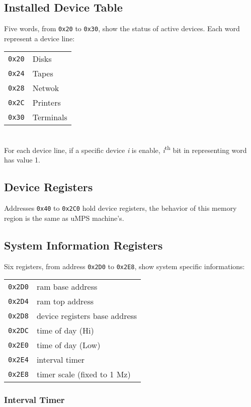 \subsection{Installed Device Table}
Five words, from \texttt{0x20} to \texttt{0x30}, show the status of active devices. Each word represent a device line:
\\

\begin{tabular}{r|l}
\texttt{0x20} & Disks \\
\texttt{0x24} & Tapes \\
\texttt{0x28} & Netwok \\
\texttt{0x2C} & Printers \\
\texttt{0x30} & Terminals \\
\end{tabular}
\\

For each device line, if a specific device \emph{i} is enable, \emph{i}\textsuperscript{th} bit in representing word has value 1.

\subsection{Device Registers}
Addresses \texttt{0x40} to \texttt{0x2C0} hold device registers, the behavior of this memory region is the same as uMPS machine's.

\subsection{System Information Registers}
Six registers, from address \texttt{0x2D0} to \texttt{0x2E8}, show system specific informations:
\\

\begin{tabular}{r|l}
\texttt{0x2D0} & ram base address \\
\texttt{0x2D4} & ram top address \\
\texttt{0x2D8} & device registers base address \\
\texttt{0x2DC} & time of day (Hi) \\
\texttt{0x2E0} & time of day (Low) \\
\texttt{0x2E4} & interval timer \\
\texttt{0x2E8} & timer scale (fixed to 1 Mz) \\
\end{tabular}

\subsubsection{Interval Timer}

